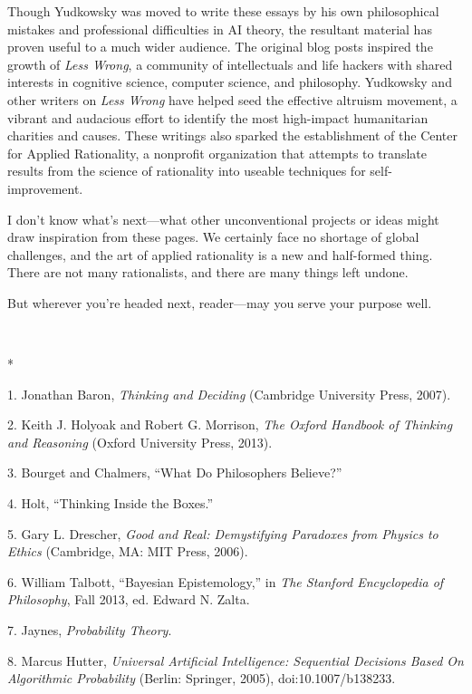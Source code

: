 {
 Though Yudkowsky was moved to write these essays by his own
philosophical mistakes and professional difficulties in AI theory, the
resultant material has proven useful to a much wider audience. The
original blog posts inspired the growth of \textit{Less Wrong}, a
community of intellectuals and life hackers with shared interests in
cognitive science, computer science, and philosophy. Yudkowsky and
other writers on \textit{Less Wrong} have helped seed the effective
altruism movement, a vibrant and audacious effort to identify the most
high-impact humanitarian charities and causes. These writings also
sparked the establishment of the Center for Applied Rationality, a
nonprofit organization that attempts to translate results from the
science of rationality into useable techniques for self-improvement.}

{
 I don't know what's next---what
other unconventional projects or ideas might draw inspiration from
these pages. We certainly face no shortage of global challenges, and
the art of applied rationality is a new and half-formed thing. There
are not many rationalists, and there are many things left undone.}

{
 But wherever you're headed next, reader---may you
serve your purpose well.}

{
 ~}

{\centering
 *
\par}


\bigskip

{
 1. Jonathan Baron, \textit{Thinking and Deciding} (Cambridge
University Press, 2007).}

{
 2. Keith J. Holyoak and Robert G. Morrison, \textit{The Oxford
Handbook of Thinking and Reasoning} (Oxford University Press, 2013).}

{
 3. Bourget and Chalmers, ``What Do Philosophers
Believe?''}

{
 4. Holt, ``Thinking Inside the
Boxes.''}

{
 5. Gary L. Drescher, \textit{Good and Real: Demystifying Paradoxes
from Physics to Ethics} (Cambridge, MA: MIT Press, 2006).}

{
 6. William Talbott, ``Bayesian
Epistemology,'' in \textit{The Stanford Encyclopedia
of Philosophy}, Fall 2013, ed. Edward N. Zalta.}

{
 7. Jaynes, \textit{Probability Theory}.}

{
 8. Marcus Hutter, \textit{Universal Artificial Intelligence:
Sequential Decisions Based On Algorithmic Probability} (Berlin:
Springer, 2005), doi:10.1007/b138233.}

